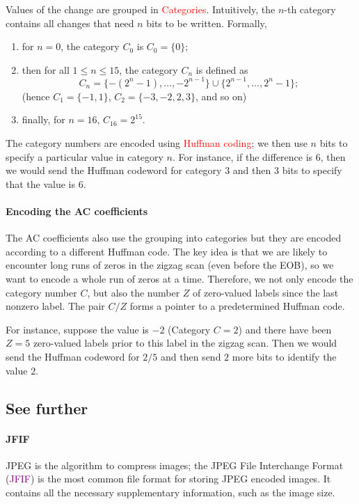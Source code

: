 \documentclass[a4paper, 11pt, openany]{book}
\numberwithin{equation}{section}
\theoremstyle{plain}
\theoremstyle{definition}
\newcommand{\Important}[1]{\textcolor{red}{#1}}
\newcommand{\Define}[1]{\textcolor{purple}{#1}}
\begin{document}
Values of the change are grouped in \Important{Categories}. Intuitively, the $n$-th category contains all changes that need $n$ bits to be written. Formally,
\begin{enumerate}
    \item for $n=0$, the category $C_0$ is $C_0 = \{0\}$;
    
    \item  then for all $1 \le n \le 15$, the category $C_n$ is defined as
    \[
        C_n = \{ -(2^n - 1), \dots, -2^{n-1} \} \cup \{ 2^{n-1}, \dots, 2^n - 1 \};
    \]
    (hence $C_1 = \{-1,1\}$, $C_2 = \{-3, -2, 2, 3\}$, and so on)
    
    \item finally, for $n=16$, $C_{16} = 2^{15}$.
\end{enumerate}
The category numbers are encoded using \Important{Huffman coding}; we then use $n$ bits to specify a particular value in category $n$. For instance, if the difference is $6$, then we would send the Huffman codeword for category $3$ and then $3$ bits to specify that the value is $6$.


\paragraph{Encoding the AC coefficients}
The AC coefficients also use the grouping into categories but they are encoded according to a different Huffman code. The key idea is that we are likely to encounter long runs of zeros in the zigzag scan (even before the EOB), so we want to encode a whole run of zeros at a time. Therefore, we not only encode the category number $C$, but also the number $Z$ of zero-valued labels since the last nonzero label. The pair $C/Z$ forms a pointer to a predetermined Huffman code. 

For instance, suppose the value is $-2$ (Category $C = 2$) and there have been $Z = 5$ zero-valued labels prior to this label in the zigzag scan. Then we would send the Huffman codeword for $2/5$ and then send $2$ more bits to identify the value $2$.







\subsection{See further}


\paragraph{JFIF} JPEG is the algorithm to compress images; the JPEG File Interchange Format (\Define{JFIF}) is the most common file format for storing JPEG encoded images. It contains all the necessary supplementary information, such as the image size.
\end{document}
